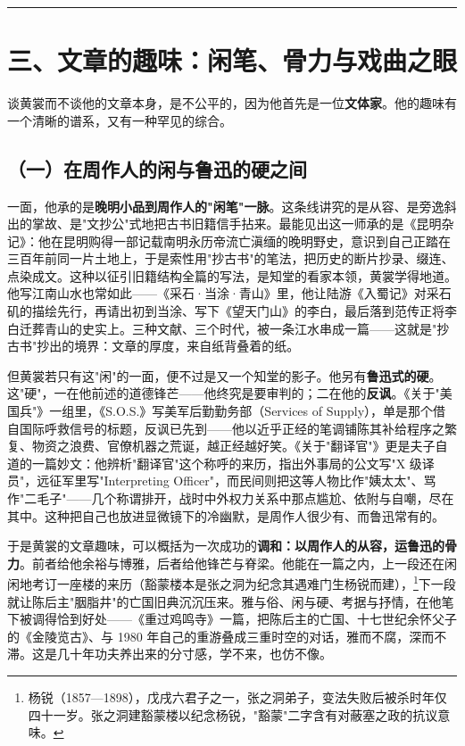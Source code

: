 \documentclass[UTF8,fontset=none,zihao=-4,a4paper]{ctexart}
\begin{document}
\medskip\hrule\medskip

\section{三、文章的趣味：闲笔、骨力与戏曲之眼}


谈黄裳而不谈他的文章本身，是不公平的，因为他首先是一位\textbf{文体家}。他的趣味有一个清晰的谱系，又有一种罕见的综合。


\subsection{（一）在周作人的闲与鲁迅的硬之间}


一面，他承的是\textbf{晚明小品到周作人的"闲笔"一脉}。这条线讲究的是从容、是旁逸斜出的掌故、是"文抄公"式地把古书旧籍信手拈来。最能见出这一师承的是《昆明杂记》：他在昆明购得一部记载南明永历帝流亡滇缅的晚明野史，意识到自己正踏在三百年前同一片土地上，于是索性用"抄古书"的笔法，把历史的断片抄录、缀连、点染成文。这种以征引旧籍结构全篇的写法，是知堂的看家本领，黄裳学得地道。他写江南山水也常如此——《采石·当涂·青山》里，他让陆游《入蜀记》对采石矶的描绘先行，再请出初到当涂、写下《望天门山》的李白，最后落到范传正将李白迁葬青山的史实上。三种文献、三个时代，被一条江水串成一篇——这就是"抄古书"抄出的境界：文章的厚度，来自纸背叠着的纸。


但黄裳若只有这"闲"的一面，便不过是又一个知堂的影子。他另有\textbf{鲁迅式的硬}。这"硬"，一在他前述的道德锋芒——他终究是要审判的；二在他的\textbf{反讽}。《关于"美国兵"》一组里，《S.O.S.》写美军后勤勤务部（Services of Supply），单是那个借自国际呼救信号的标题，反讽已先到——他以近乎正经的笔调铺陈其补给程序之繁复、物资之浪费、官僚机器之荒诞，越正经越好笑。《关于"翻译官"》更是夫子自道的一篇妙文：他辨析"翻译官"这个称呼的来历，指出外事局的公文写"X 级译员"，远征军里写"Interpreting Officer"，而民间则把这等人物比作"姨太太"、骂作"二毛子"——几个称谓排开，战时中外权力关系中那点尴尬、依附与自嘲，尽在其中。这种把自己也放进显微镜下的冷幽默，是周作人很少有、而鲁迅常有的。


于是黄裳的文章趣味，可以概括为一次成功的\textbf{调和：以周作人的从容，运鲁迅的骨力}。前者给他余裕与博雅，后者给他锋芒与脊梁。他能在一篇之内，上一段还在闲闲地考订一座楼的来历（豁蒙楼本是张之洞为纪念其遇难门生杨锐而建），\footnote{杨锐（1857—1898），戊戌六君子之一，张之洞弟子，变法失败后被杀时年仅四十一岁。张之洞建豁蒙楼以纪念杨锐，"豁蒙"二字含有对蔽塞之政的抗议意味。}下一段就让陈后主"胭脂井"的亡国旧典沉沉压来。雅与俗、闲与硬、考据与抒情，在他笔下被调得恰到好处——《重过鸡鸣寺》一篇，把陈后主的亡国、十七世纪余怀父子的《金陵览古》、与 1980 年自己的重游叠成三重时空的对话，雅而不腐，深而不滞。这是几十年功夫养出来的分寸感，学不来，也仿不像。
\end{document}
